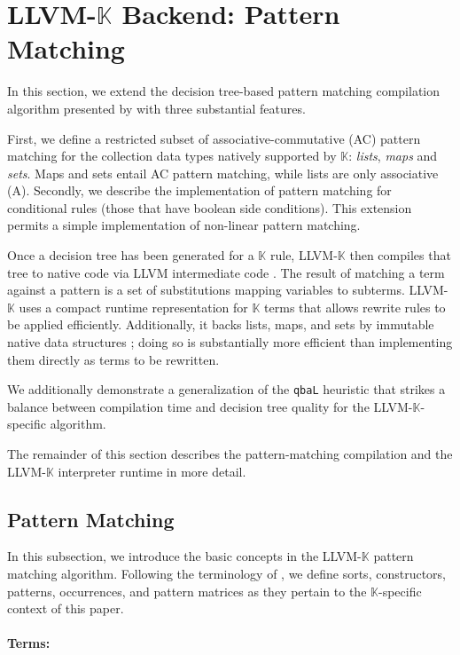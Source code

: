 \documentclass{article}
\theoremstyle{definition}
\newcommand{\K}{$\mathbb{K}$\xspace}
\newcommand{\KL}{LLVM-\K}
\begin{document}
\section{\KL Backend: Pattern Matching} \label{sec:k-llvm}
In this section, we extend the decision tree-based pattern matching compilation
algorithm presented by \citet{Maranget2008} with three substantial features.

First, we define a restricted subset of associative-commutative (AC) pattern
matching \cite{Hvllot1979} for the collection data types natively supported by
\K: \emph{lists}, \emph{maps} and \emph{sets}. Maps and sets entail AC pattern
matching, while lists are only associative (A). Secondly, we describe the
implementation of pattern matching for conditional rules (those that have
boolean side conditions). This extension permits a simple implementation of
non-linear pattern matching.

Once a decision tree has been generated for a \K rule, \KL then compiles that
tree to native code via LLVM intermediate code \cite{Lattner2004}. The result of
matching a term against a pattern is a set of substitutions mapping variables to
subterms.
\KL uses a compact runtime representation for \K terms that allows rewrite
rules to be applied efficiently. Additionally, it backs lists, maps, and sets by
immutable native data structures \cite{Bolivar2017}; doing so is substantially
more efficient than implementing them directly as terms to be rewritten.

We additionally demonstrate a generalization of the \texttt{qbaL} heuristic
\cite{Maranget2008,Scott2000} that strikes a balance between compilation time
and decision tree quality for the \KL-specific algorithm.


The remainder of this section describes the pattern-matching compilation and the
\KL interpreter runtime in more detail.

\subsection{Pattern Matching}

In this subsection, we introduce the basic concepts in the \KL pattern matching
algorithm. Following the terminology of \citet{Maranget2008}, we define sorts,
constructors, patterns, occurrences, and pattern matrices as they pertain to the
\K-specific context of this paper.

\paragraph{Terms:}
\end{document}
